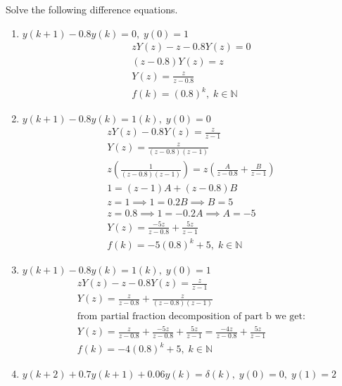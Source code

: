 \documentclass[12pt]{article}
\newcommand{\N}{\mathbb{N}}
\newenvironment{problem}[2][Problem]{\begin{trivlist}
\item[\hskip \labelsep {\bfseries #1}\hskip \labelsep {\bfseries #2.}]}{\end{trivlist}}
\begin{document}
\begin{problem}{2} %
    Solve the following difference equations. 
    \begin{enumerate}[label=\alph*.]
        \item $y(k+1)-0.8y(k)=0,\; y(0)=1$\\
        \begin{align*}
            zY(z)-z-0.8Y(z)=0\\
            (z-0.8)Y(z)=z\\
            Y(z) = \frac{z}{z-0.8}\\
            f(k)=(0.8)^k,\;k\in \N
        \end{align*}
        \item $y(k+1)-0.8y(k)=1(k),\; y(0)=0$\\
        \begin{align*}
            zY(z)-0.8Y(z)=\frac{z}{z-1}\\
            Y(z)=\frac{z}{(z-0.8)(z-1)}\\
            z\left(\frac{1}{(z-0.8)(z-1)}\right)=z\left(\frac{A}{z-0.8}+\frac{B}{z-1}\right)\\
            1 = (z-1)A + (z-0.8)B\\
            z=1\implies 1=0.2B \implies B=5\\
            z=0.8\implies 1=-0.2A \implies A=-5\\
            Y(z)=\frac{-5z}{z-0.8} + \frac{5z}{z-1}\\
            f(k)=-5(0.8)^k + 5,\;k\in \N
        \end{align*}
        \item $y(k+1)-0.8y(k)=1(k),\; y(0)=1$\\
        \begin{align*}
            zY(z)-z-0.8Y(z)=\frac{z}{z-1}\\
            Y(z)=\frac{z}{z-0.8}+\frac{z}{(z-0.8)(z-1)}\\
            \text{from partial fraction decomposition of part b we get:}\\
            Y(z)=\frac{z}{z-0.8}+\frac{-5z}{z-0.8} + \frac{5z}{z-1}=\frac{-4z}{z-0.8} + \frac{5z}{z-1}\\
            f(k)=-4(0.8)^k + 5,\;k\in \N
        \end{align*}
        \pagebreak
        \item $y(k+2)+0.7y(k+1)+0.06y(k)=\delta(k),\; y(0)=0,\;y(1)=2$\\

\end{enumerate}
\end{problem}
\end{document}
